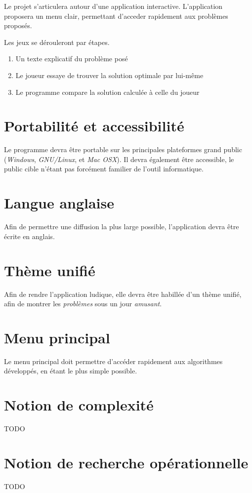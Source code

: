 Le projet s'articulera autour d'une application interactive.
L'application proposera un menu clair, permettant
d'acceder rapidement aux problèmes proposés.

Les jeux se dérouleront par étapes.
\begin{enumerate}
    \item Un texte explicatif du problème posé
    \item Le joueur essaye de trouver la solution optimale par lui-même
    \item Le programme compare la solution calculée à celle du joueur
\end{enumerate}

\section{Portabilité et accessibilité}
    Le programme devra être portable sur les principales plateformes
    grand public (\emph{Windows}, \emph{GNU/Linux}, et \emph{Mac OSX}).
    Il devra également être accessible, le public cible n'étant
    pas forcément familier de l'outil informatique.

\section{Langue anglaise}
    Afin de permettre une diffusion la plus large possible,
    l'application devra être écrite en anglais.

\section{Thème unifié}
    Afin de rendre l'application ludique, elle devra
    être habillée d'un thème unifié,
    afin de montrer les \emph{problèmes} sous un
    jour \emph{amusant}.

\section{Menu principal}
    Le menu principal doit permettre d'accéder rapidement
    aux algorithmes développés, en étant le plus simple possible.

\section{Notion de complexité}
TODO

\section{Notion de recherche opérationnelle}
TODO
